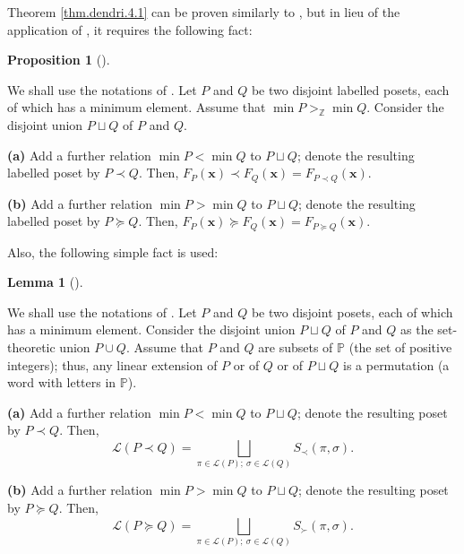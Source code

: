 \documentclass[numbers=enddot,12pt,final,onecolumn,notitlepage]{scrartcl}%
\theoremstyle{definition}
\newtheorem{lem}[theo]{Lemma}
\newenvironment{lemma}[1][]
{\begin{lem}[#1]\begin{leftbar}}
{\end{leftbar}\end{lem}}
\newtheorem{prop}[theo]{Proposition}
\newenvironment{proposition}[1][]
{\begin{prop}[#1]\begin{leftbar}}
{\end{leftbar}\end{prop}}
\begin{document}
Theorem \ref{thm.dendri.4.1} can be proven similarly to \cite[(5.2.6)]%
{HopfComb}, but in lieu of the application of \cite[Lemma 5.2.17]{HopfComb},
it requires the following fact:

\begin{proposition}
\label{prop.dendri.4.1.lem}We shall use the notations of \cite[Section
5.2]{HopfComb}. Let $P$ and $Q$ be two disjoint labelled posets, each of which
has a minimum element. Assume that $\min P>_{\mathbb{Z}}\min Q$. Consider the
disjoint union $P\sqcup Q$ of $P$ and $Q$.

\textbf{(a)} Add a further relation $\min P<\min Q$ to $P\sqcup Q$; denote the
resulting labelled poset by $P\left.  \prec\right.  Q$. Then, $F_{P}\left(
\mathbf{x}\right)  \left.  \prec\right.  F_{Q}\left(  \mathbf{x}\right)
=F_{P\left.  \prec\right.  Q}\left(  \mathbf{x}\right)  $.

\textbf{(b)} Add a further relation $\min P>\min Q$ to $P\sqcup Q$; denote the
resulting labelled poset by $P\left.  \succeq\right.  Q$. Then, $F_{P}\left(
\mathbf{x}\right)  \left.  \succeq\right.  F_{Q}\left(  \mathbf{x}\right)
=F_{P\left.  \succeq\right.  Q}\left(  \mathbf{x}\right)  $.
\end{proposition}

Also, the following simple fact is used:

\begin{lemma}
\label{lem.dendri.4.1.lem2}We shall use the notations of \cite[Section
5.2]{HopfComb}. Let $P$ and $Q$ be two disjoint posets, each of which has a
minimum element. Consider the disjoint union $P\sqcup Q$ of $P$ and $Q$ as the
set-theoretic union $P\cup Q$. Assume that $P$ and $Q$ are subsets of
$\mathbb{P}$ (the set of positive integers); thus, any linear extension of $P$
or of $Q$ or of $P\sqcup Q$ is a permutation (a word with letters in
$\mathbb{P}$).

\textbf{(a)} Add a further relation $\min P<\min Q$ to $P\sqcup Q$; denote the
resulting poset by $P\left.  \prec\right.  Q$. Then,
\[
\mathcal{L}\left(  P\left.  \prec\right.  Q\right)  =\bigsqcup_{\pi
\in\mathcal{L}\left(  P\right)  ;\ \sigma\in\mathcal{L}\left(  Q\right)
}S_{\prec}\left(  \pi,\sigma\right)  .
\]


\textbf{(b)} Add a further relation $\min P>\min Q$ to $P\sqcup Q$; denote the
resulting poset by $P\left.  \succeq\right.  Q$. Then,
\[
\mathcal{L}\left(  P\left.  \succeq\right.  Q\right)  =\bigsqcup_{\pi
\in\mathcal{L}\left(  P\right)  ;\ \sigma\in\mathcal{L}\left(  Q\right)
}S_{\succ}\left(  \pi,\sigma\right)  .
\]

\end{lemma}
\end{document}
